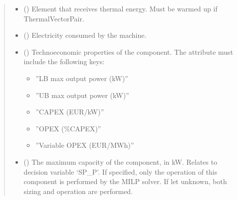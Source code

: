 \documentclass[letterpaper,10pt,english]{sphinxmanual}
\begin{document}
\begin{fulllineitems}
\begin{fulllineitems}
\begin{quote}
\begin{description}
\begin{itemize}
\item {} 
\sphinxAtStartPar
{} () \textendash{} Element that receives thermal energy.
Must be warmed up if ThermalVectorPair.

\item {} 
\sphinxAtStartPar
{} ({\hyperref[\detokenize{generated/tamos.element.ElectricityVector:tamos.element.ElectricityVector}]{}}) \textendash{} Electricity consumed by the machine.

\item {} 
\sphinxAtStartPar
{} (\sphinxstyleliteralemphasis{\sphinxupquote{ | }}) \textendash{} 
\sphinxAtStartPar
Techno\sphinxhyphen{}economic properties of the component.
The  attribute must include the following keys:
\begin{itemize}
\item {} 
\sphinxAtStartPar
”LB max output power (kW)”

\item {} 
\sphinxAtStartPar
”UB max output power (kW)”

\item {} 
\sphinxAtStartPar
”CAPEX (EUR/kW)”

\item {} 
\sphinxAtStartPar
”OPEX (\%CAPEX)”

\item {} 
\sphinxAtStartPar
”Variable OPEX (EUR/MWh)”

\end{itemize}


\item {} 
\sphinxAtStartPar
{} (\sphinxstyleliteralemphasis{\sphinxupquote{, }}) \textendash{} The maximum capacity of the component, in kW.
Relates to decision variable ‘SP\_P’.
If specified, only the operation of this component is performed by the MILP solver.
If let unknown, both sizing and operation are performed.


\end{itemize}
\end{description}
\end{quote}
\end{fulllineitems}
\end{fulllineitems}
\end{document}
